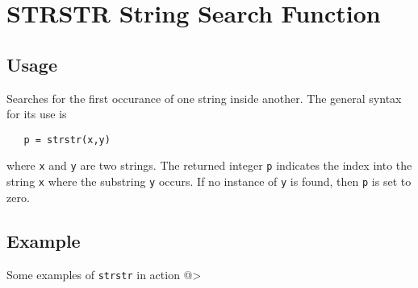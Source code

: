 \section{STRSTR String Search Function}

\subsection{Usage}

Searches for the first occurance of one string inside another.
The general syntax for its use is
\begin{verbatim}
   p = strstr(x,y)
\end{verbatim}
where \verb|x| and \verb|y| are two strings.  The returned integer \verb|p|
indicates the index into the string \verb|x| where the substring \verb|y|
occurs.  If no instance of \verb|y| is found, then \verb|p| is set to
zero.
\subsection{Example}

Some examples of \verb|strstr| in action
@>
